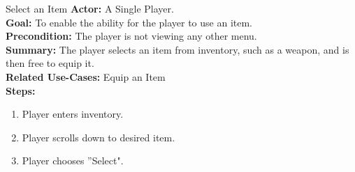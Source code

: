 \documentclass[12pt]{report}
\begin{document}
\begin{subsection}{Select an Item}
\textbf{Actor:} A Single Player. \\
\textbf{Goal:} To enable the ability for the player to use an item. \\
\textbf{Precondition:} The player is not viewing any other menu. \\
\textbf{Summary:} The player selects an item from inventory, such as a weapon, and is then free to equip it. \\
\textbf{Related Use-Cases:} Equip an Item \\
\textbf{Steps:}
\begin{enumerate}
   \item Player enters inventory.
   \item Player scrolls down to desired item.
   \item Player chooses ''Select".
\end{enumerate}
\end{subsection}
\end{document}
